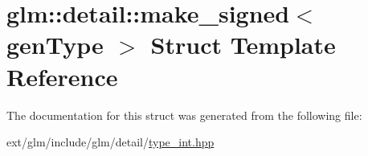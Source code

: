 \hypertarget{structglm_1_1detail_1_1make__signed}{\section{glm\-:\-:detail\-:\-:make\-\_\-signed$<$ gen\-Type $>$ Struct Template Reference}
\label{structglm_1_1detail_1_1make__signed}
}


The documentation for this struct was generated from the following file\-:\begin{DoxyCompactItemize}
\item 
ext/glm/include/glm/detail/\hyperlink{type__int_8hpp}{type\-\_\-int.\-hpp}\end{DoxyCompactItemize}
